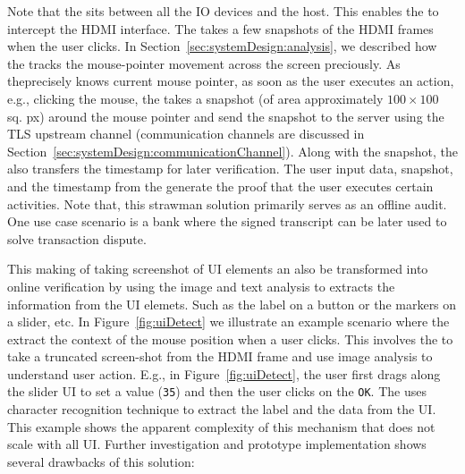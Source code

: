 Note that the \device sits between all the IO devices and the host. This enables the \device to intercept the HDMI interface. The \device takes a few snapshots of the HDMI frames when the user clicks. In Section~\ref{sec:systemDesign:analysis}, we described how the \device tracks the mouse-pointer movement across the screen preciously. As the\device precisely knows current mouse pointer, as soon as the user executes an action, e.g., clicking the mouse, the \device takes a snapshot (of area approximately $100 \times 100$ sq. px) around the mouse pointer and send the snapshot to the server using the TLS upstream channel (communication channels are discussed in Section~\ref{sec:systemDesign:communicationChannel}). Along with the snapshot, the \device also transfers the timestamp for later verification. The user input data, snapshot, and the timestamp from the \device generate the proof that the user executes certain activities. Note that, this strawman solution primarily serves as an offline audit. One use case scenario is a bank where the signed transcript can be later used to solve transaction dispute. 

This making of taking screenshot of UI elements an also be transformed into online verification by using the image and text analysis to extracts the information from the UI elemets. Such as the label on a button or the markers on a slider, etc. In Figure~\ref{fig:uiDetect} we illustrate an example scenario where the \device extract the context of the mouse position when a user clicks. This involves the \device to take a truncated screen-shot from the HDMI frame and use image analysis to understand user action. E.g., in Figure~\ref{fig:uiDetect}, \one the user first drags along the slider UI to set a value (\texttt{35}) and then \two the user clicks on the \texttt{OK}. The \device uses character recognition technique to extract the label and the data from the UI. This example shows the apparent complexity of this mechanism that does not scale with all UI. Further investigation and prototype implementation shows several drawbacks of this solution:



